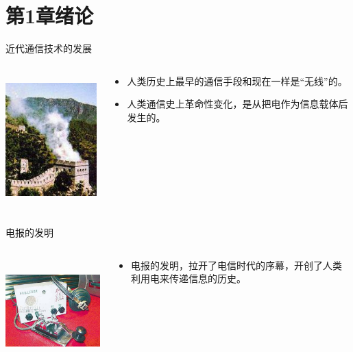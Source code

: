 \section{第1章\quad 绪论}

\begin{frame}{近代通信技术的发展}
  \begin{columns}
    \begin{column}{0.35\linewidth}
      \centering
      \includegraphics[height=5cm]{Cha1//fenghuotai2.jpg}
    \end{column}
    \begin{column}{0.65\linewidth}
      \centering
      \begin{itemize}
        \item 人类历史上最早的通信手段和现在一样是“无线”的。
        \item 人类通信史上革命性变化，是从把电作为信息载体后发生的。
      \end{itemize}
    \end{column}
  \end{columns}
\end{frame}

\begin{frame}{电报的发明}
  \begin{columns}
    \begin{column}{0.5\linewidth}
      \includegraphics[height=4cm]{Cha1//dianbao}
    \end{column}
    \begin{column}{0.5\linewidth}
      \begin{itemize}
        \item 电报的发明，拉开了电信时代的序幕，开创了人类利用电来传递信息的历史。
      \end{itemize}
    \end{column}
  \end{columns}
\end{frame}

